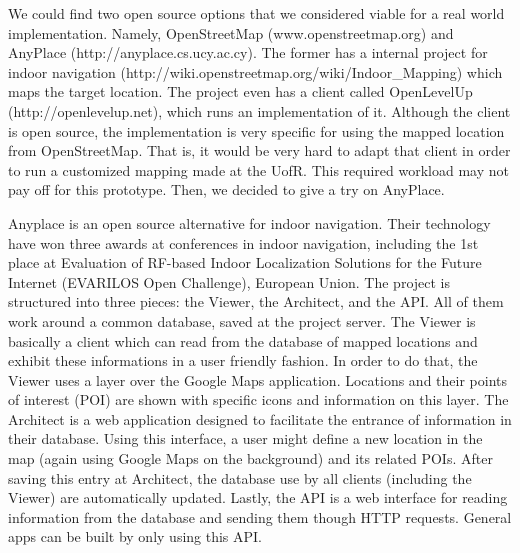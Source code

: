 We could find two open source options that we considered viable for a real world implementation.
Namely, OpenStreetMap (www.openstreetmap.org) and AnyPlace (http://anyplace.cs.ucy.ac.cy).
The former has a internal project for indoor navigation (http://wiki.openstreetmap.org/wiki/Indoor\_Mapping) which maps the target location.
The project even has a client called OpenLevelUp (http://openlevelup.net), which runs an implementation of it.
Although the client is open source, the implementation is very specific for using the mapped location from OpenStreetMap.
That is, it would be very hard to adapt that client in order to run a customized mapping made at the UofR.
This required workload may not pay off for this prototype.
Then, we decided to give a try on AnyPlace.

Anyplace \cite{zeinalipour:IEEEIC16} is an open source alternative for indoor navigation.
Their technology have won three awards at conferences in indoor navigation, including the 1st place at Evaluation of RF-based Indoor Localization Solutions for the Future Internet (EVARILOS Open Challenge), European Union.
The project is structured into three pieces: the Viewer, the Architect, and the API.
All of them work around a common database, saved at the project server.
The Viewer is basically a client which can read from the database of mapped locations and exhibit these informations in a user friendly fashion.
In order to do that, the Viewer uses a layer over the Google Maps application.
Locations and their points of interest (POI) are shown with specific icons and information on this layer.
The Architect is a web application designed to facilitate the entrance of information in their database.
Using this interface, a user might define a new location in the map (again using Google Maps on the background) and its related POIs.
After saving this entry at Architect, the database use by all clients (including the Viewer) are automatically updated.
Lastly, the API is a web interface for reading information from the database and sending them though HTTP requests.
General apps can be built by only using this API.

